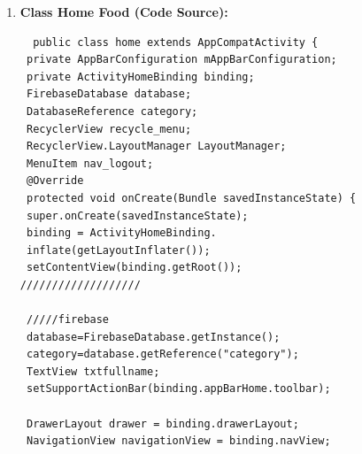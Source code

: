 \begin{enumerate}
\begin{lstlisting}
Toast.makeText(MainActivity2.this,""
+a,Toast.LENGTH_LONG).show();
 HashMap hashMap = new HashMap();
hashMap.put("quantite",a);
refr1.child(clickitem.getName().toString())
.updateChildren(hashMap).addOn
SuccessListener(new OnSuccessListener() {
 @Override
public void onSuccess(Object o) {

Toast.makeText(MainActivity2.this, "sucsses",
Toast.LENGTH_LONG)
.show();
 }
 });
Toast.makeText(MainActivity2.this,"okkkkk",
Toast.LENGTH_LONG).show();

commande cm2=new commande();
cm2.setName(clickitem.getName());
 cm2.setQuantite(clickitem.getQuantite());
 cm2.setPhoneOw(phoneownerr);

refr3.child(clickitem.getPhoneOw().toString())
.push().setValue(cm2);
 }
 }).setNegativeButton("delete", new
DialogInterface.OnClickListener() {
 @Override
public void onClick(DialogInterface dialog,
int which) {

refr2.child(phoneownerr).child(getRef(position)
.getKey()).removeValue();

 }
}).show();}});};
 recycle1.setAdapter(adapter);
 }}
  \end{lstlisting}
  
  \newpage
  \item \textbf{Class Home Food  (Code Source):}
  \begin{lstlisting}
  public class home extends AppCompatActivity {
 private AppBarConfiguration mAppBarConfiguration;
 private ActivityHomeBinding binding;
 FirebaseDatabase database;
 DatabaseReference category;
 RecyclerView recycle_menu;
 RecyclerView.LayoutManager LayoutManager;
 MenuItem nav_logout;
 @Override
 protected void onCreate(Bundle savedInstanceState) {
 super.onCreate(savedInstanceState);
 binding = ActivityHomeBinding.
 inflate(getLayoutInflater());
 setContentView(binding.getRoot());
///////////////////
 
 /////firebase
 database=FirebaseDatabase.getInstance();
 category=database.getReference("category");
 TextView txtfullname;
 setSupportActionBar(binding.appBarHome.toolbar);

 DrawerLayout drawer = binding.drawerLayout;
 NavigationView navigationView = binding.navView;
 

\end{lstlisting}
\end{enumerate}
